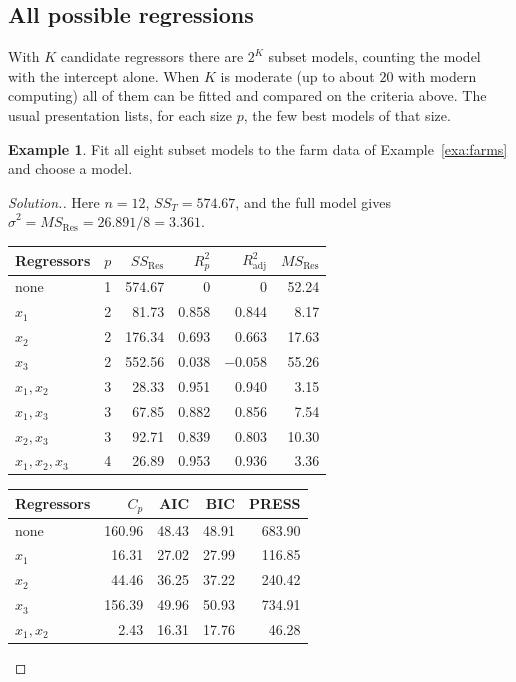 \documentclass[11pt,a4paper]{article}
\numberwithin{equation}{section}
\theoremstyle{definition}
\newtheorem{exa}[thm]{Example}
\newenvironment{solution}
  {\renewcommand{\qedsymbol}{}\begin{proof}[\textit{Solution}.]}
  {\end{proof}}
\begin{document}
\subsection{All possible regressions}
With $K$ candidate regressors there are $2^K$ subset models, counting the model with the
intercept alone. When $K$ is moderate (up to about $20$ with modern computing) all of them can be
fitted and compared on the criteria above. The usual presentation lists, for each size $p$, the
few best models of that size.

\begin{exa}\label{exa:farms-all}
Fit all eight subset models to the farm data of Example~\ref{exa:farms} and choose a model.
\end{exa}

\begin{solution}
Here $n = 12$, $SS_T = 574.67$, and the full model gives $\hat\sigma^2 = MS_{\mathrm{Res}} = 26.891/8 = 3.361$.
\begin{center}
\begin{tabular}{l|crrrr}
Regressors & $p$ & $SS_{\mathrm{Res}}$ & $R^2_p$ & $R^2_{\mathrm{adj}}$ & $MS_{\mathrm{Res}}$ \\
\hline
none & 1 & 574.67 & 0 & 0 & 52.24 \\
$x_1$ & 2 & 81.73 & 0.858 & 0.844 & 8.17 \\
$x_2$ & 2 & 176.34 & 0.693 & 0.663 & 17.63 \\
$x_3$ & 2 & 552.56 & 0.038 & $-0.058$ & 55.26 \\
$x_1, x_2$ & 3 & 28.33 & 0.951 & 0.940 & 3.15 \\
$x_1, x_3$ & 3 & 67.85 & 0.882 & 0.856 & 7.54 \\
$x_2, x_3$ & 3 & 92.71 & 0.839 & 0.803 & 10.30 \\
$x_1, x_2, x_3$ & 4 & 26.89 & 0.953 & 0.936 & 3.36 \\
\end{tabular}
\end{center}
\begin{center}
\begin{tabular}{l|rrrr}
Regressors & $C_p$ & AIC & BIC & PRESS \\
\hline
none & 160.96 & 48.43 & 48.91 & 683.90 \\
$x_1$ & 16.31 & 27.02 & 27.99 & 116.85 \\
$x_2$ & 44.46 & 36.25 & 37.22 & 240.42 \\
$x_3$ & 156.39 & 49.96 & 50.93 & 734.91 \\
$x_1, x_2$ & 2.43 & 16.31 & 17.76 & 46.28 \\

\end{tabular}
\end{center}
\end{solution}
\end{document}
